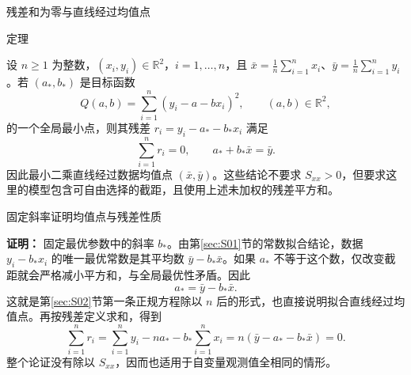 \documentclass[aspectratio=169,10pt,fontset=fandol]{ctexbeamer}
\begin{document}
\begin{frame}[t,fragile]{残差和为零与直线经过均值点}
\footnotesize
\begin{block}{定理}
{\footnotesize
设 $n\geq1$ 为整数，$(x_i,y_i)\in\mathbb{R}^2$，$i=1,\ldots,n$，且 $\bar{x}=\frac1n\sum_{i=1}^{n}x_i$、$\bar{y}=\frac1n\sum_{i=1}^{n}y_i$。若 $(a_*,b_*)$ 是目标函数
\[
Q(a,b)=\sum_{i=1}^{n}(y_i-a-bx_i)^2,\qquad (a,b)\in\mathbb{R}^2,
\]
的一个全局最小点，则其残差 $r_i=y_i-a_*-b_*x_i$ 满足
\[
\sum_{i=1}^{n}r_i=0,\qquad a_*+b_*\bar{x}=\bar{y}.
\]
因此最小二乘直线经过数据均值点 $(\bar{x},\bar{y})$。这些结论不要求 $S_{xx}>0$，但要求这里的模型包含可自由选择的截距，且使用上述未加权的残差平方和。

}
\end{block}
\end{frame}
\begin{frame}[t,fragile]{固定斜率证明均值点与残差性质}
\footnotesize
{\footnotesize
\textbf{证明：}
固定最优参数中的斜率 $b_*$。由第\ref{sec:S01}节的常数拟合结论，数据 $y_i-b_*x_i$ 的唯一最优常数是其平均数 $\bar{y}-b_*\bar{x}$。如果 $a_*$ 不等于这个数，仅改变截距就会严格减小平方和，与全局最优性矛盾。因此
\[
a_* =\bar{y}-b_*\bar{x}.
\]
这就是第\ref{sec:S02}节第一条正规方程除以 $n$ 后的形式，也直接说明拟合直线经过均值点。再按残差定义求和，得到
\[
\sum_{i=1}^{n}r_i
=\sum_{i=1}^{n}y_i-na_*-b_*\sum_{i=1}^{n}x_i
=n(\bar{y}-a_*-b_*\bar{x})=0.
\]
整个论证没有除以 $S_{xx}$，因而也适用于自变量观测值全相同的情形。

}
\end{frame}
\end{document}
